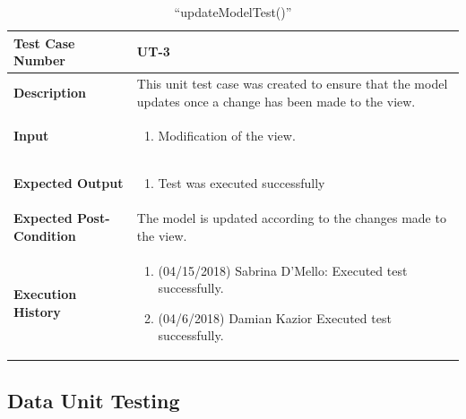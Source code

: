 \documentclass[12pt]{article}
\begin{document}
\begin{table}[H]
\caption{“updateModelTest()”}
\begin{center}
\begin{tabular}{|p{5.5cm}|p{11cm}|}
  \hline
  \bf Test Case Number & UT-3\\\hline
  \bf Description & 
  This unit test case was created to ensure that the model updates once a change has been made to the view.\\\hline
  \bf Input &
  \begin{enumerate}
  \item Modification of the view.
  \end{enumerate}
  \\\hline
  \bf Expected Output &
  \begin{enumerate}
  \item Test was executed successfully
  \end{enumerate}
  \\\hline
  \bf Expected Post-Condition & 
  The model is updated according to the changes made to the view.
  \\\hline   
  \bf Execution History & 
  \begin{enumerate}
  \item (04/15/2018) Sabrina D’Mello: Executed test successfully.
  \item (04/6/2018) Damian Kazior Executed test successfully.
  \end{enumerate}
  \\\hline
\end{tabular}
\end{center}
\end{table}


\subsection{Data Unit Testing} \label{ut:2}
\end{document}
